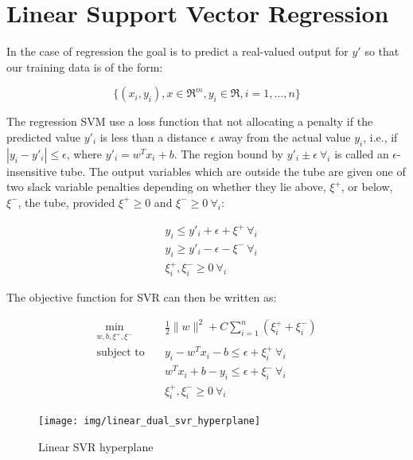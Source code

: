 \section{Linear Support Vector Regression} \label{section:svr}

In the case of regression the goal is to predict a real-valued output for $y'$ so that our training data is of the form:

\begin{equation}
	\{(x_i,y_i), x\in\Re^m, y_i\in\Re, i=1, \dots, n\} \label{eq:svr_data}
\end{equation}

The regression SVM use a loss function that not allocating a penalty if the predicted value $y'_i$ is less than a distance $\epsilon$ away from the actual value $y_i$, i.e., if $|y_i-y'_i| \leq \epsilon$, where $y'_i = w^T x_i + b$. The region bound by $y'_i\pm\epsilon \ \forall_i$ is called an $\epsilon$-insensitive tube. The output variables which are outside the tube are given one of two slack variable penalties depending on whether they lie above, $\xi^+$, or below, $\xi^-$, the tube, provided $\xi^+ \geq 0$ and $\xi^- \geq 0 \ \forall_i$:

\begin{equation} \label{eq:svr_consts}
	\begin{aligned}
		& y_i\leq y'_i+\epsilon+\xi^+ \ \forall_i \\
    	& y_i\geq y'_i-\epsilon-\xi^- \ \forall_i \\
    	& \xi_i^+, \xi_i^- \geq 0 \ \forall_i
	\end{aligned}
\end{equation}

The objective function for SVR can then be written as:

\begin{equation} \label{eq:quad_svr_obj}
    \begin{aligned}
        \min_{w,b,\xi^+,\xi^-} \quad & \frac{1}{2} \| w \|^2 + C \sum_{i=1}^n (\xi_i^+ + \xi_i^-) \\
            \text{subject to} \quad & y_i - w^T x_i - b \leq \epsilon + \xi_i^+ \ \forall_i \\ & w^T x_i + b - y_i \leq \epsilon + \xi_i^- \ \forall_i \\ & \xi_i^+, \xi_i^- \geq 0 \ \forall_i
    \end{aligned}
\end{equation}

\begin{figure}[h!]
	\centering
  	\texttt{[image: img/linear\_dual\_svr\_hyperplane]}
  	\caption{Linear SVR hyperplane}
  	\label{fig:linear_dual_svr_hyperplane}
\end{figure}

